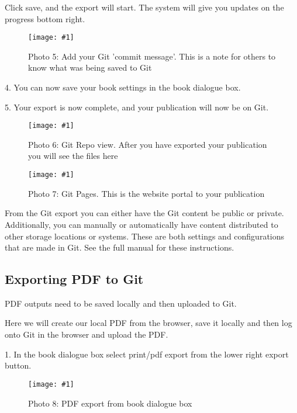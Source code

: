 \documentclass{article}
\newlength{\imgwidth}
\newcommand\scaledgraphics[2]{%
                
\settowidth{\imgwidth}{\texttt{[image: \#1]}}%
                
\setlength{\imgwidth}{\minof{\imgwidth}{#2\textwidth}}%
                
\texttt{[image: \#1]}%
                
}
\begin{document}
Click save, and the export will start. The system will give you updates on the progress bottom right.

\begin{figure}
\scaledgraphics{f0c15393-b51c-4a2d-acb3-09b5b3507c7e.png}{1}
\caption*{Photo 5: Add your Git 'commit message'. This is a note for others to know what was being saved to Git}\label{F93829001}
\end{figure}


4. You can now save your book settings in the book dialogue box.


5. Your export is now complete, and your publication will now be on Git.

\begin{figure}
\scaledgraphics{d80dc5a5-d385-4a3b-a03a-a752ff2686c9.png}{1}
\caption*{Photo 6: Git Repo view. After you have exported your publication you will see the files here}\label{F47008381}
\end{figure}

\begin{figure}
\scaledgraphics{8b26a358-6fdd-41c6-91aa-2a1fbbf977cc.png}{1}
\caption*{Photo 7: Git Pages. This is the website portal to your publication}\label{F47388851}
\end{figure}


From the Git export you can either have the Git content be public or private. Additionally, you can manually or automatically have content distributed to other storage locations or systems. These are both settings and configurations that are made in Git. See the full manual for these instructions.


\subsection{Exporting PDF to Git}\label{H9093471}



PDF outputs need to be saved locally and then uploaded to Git. 


Here we will create our local PDF from the browser, save it locally and then log onto Git in the browser and upload the PDF.


1. In the book dialogue box select print/pdf export from the lower right export button.

\begin{figure}
\scaledgraphics{caa95109-c881-4fc6-9688-11d00c66ecb6.png}{1}
\caption*{Photo 8: PDF export from book dialogue box}\label{F35654231}
\end{figure}
\end{document}
